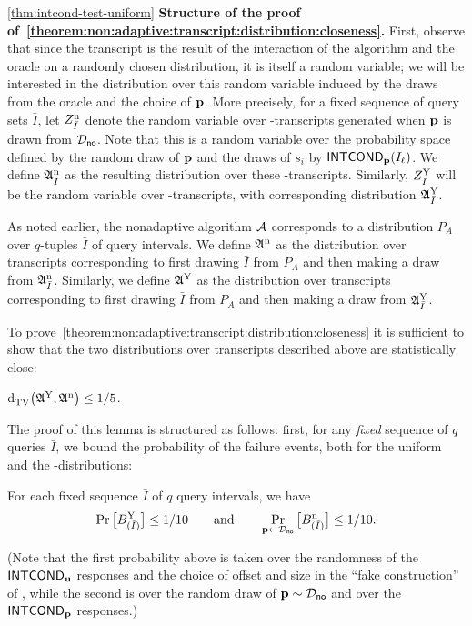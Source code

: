 \begin{proofof}{\cref{thm:intcond-test-uniform}}
\medskip
\noindent\textbf{Structure of the proof of~\cref{theorem:non:adaptive:transcript:distribution:closeness}.}
First, observe that since the transcript is the result of the interaction
of the algorithm and the oracle on a randomly chosen distribution, it is
itself a random variable; we will be interested in the distribution over
this random variable induced by the draws from the oracle and the choice
of $\mathbf{p}$.
More precisely, for a fixed sequence of query sets $\bar{I}$,
let $Z^{\rm n}_{\bar{I}}$
denote the random variable over
\no-transcripts generated when $\mathbf{p}$ is drawn from $\mathcal{D}_{\textsf{no}}$.
Note that this is a random variable over the probability space defined by
the random draw of $\mathbf{p}$ and the draws of $s_i$ by ${\sf INTCOND}_{\mathbf{p}}(I_\ell)$.
We define $\mathfrak{A}^{\rm n}_{\bar{I}}$ as the resulting distribution
over these \no-transcripts.
Similarly, $Z^{\rm Y}_{\bar{I}}$ will be the random variable
over \yes-transcripts, with corresponding distribution
$\mathfrak{A}^{\rm Y}_{\bar{I}}$.


As noted earlier, the nonadaptive algorithm $\mathcal{A}$ corresponds to a distribution
$P_A$ over $q$-tuples $\bar{I}$ of query intervals.
We define $\mathfrak{A}^{\rm n}$ as the distribution over
transcripts corresponding to first drawing $\bar{I}$ from $P_A$ and
then making a draw from $\mathfrak{A}^{\rm n}_{\bar{I}}$.
Similarly, we define
$\mathfrak{A}^{\rm Y}$ as the distribution over
transcripts corresponding to first drawing $\bar{I}$ from $P_A$ and
then making a draw from $\mathfrak{A}^{\rm Y}_{\bar{I}}$.


To prove~\cref{theorem:non:adaptive:transcript:distribution:closeness}
it is sufficient to show that the two distributions over transcripts
described above are statistically close:

\begin{lemma}\label{lemma:non:adaptive:transcript:distribution:closeness}
${\operatorname{d}_{\rm{TV}}^{}\!\left({ \mathfrak{A}^{\rm Y} ,  \mathfrak{A}^{\rm n} }\right)} \leq 1/5$.
\end{lemma}
The proof of this lemma is structured as follows:
first, for any \emph{fixed} sequence of $q$ queries $\bar{I}$, we bound the probability of the failure events, both for the uniform and the
\no-distributions:
\begin{claim}\label{claim:boundary:failure:proba}
For each fixed sequence $\bar{I}$ of $q$ query intervals, we have
\[ \Pr\big[ B^{\rm Y}_{(\bar{I})} \big] \leq 1/10 \qquad\text{and}
\qquad \Pr_{\mathbf{p}\leftarrow\mathcal{D}_{\textsf{no}}}\big[ B^{\rm n}_{(\bar{I})} \big]
\leq 1/10. \]
\end{claim}
(Note that the first probability above is taken over the randomness of
the ${\sf INTCOND}_{\mathbf{u}}$ responses and the choice of offset and size in the ``fake construction'' of \uniform, while the second is over the random draw of $\mathbf{p}
\sim \mathcal{D}_{\textsf{no}}$ and over the ${\sf INTCOND}_{\mathbf{p}}$ responses.)


\end{proofof}
